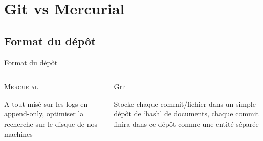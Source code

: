 \section{Git vs Mercurial}
\subsection{Format du dépôt}
\begin{frame}{Format du dépôt}
  \begin{columns}[T]

    \begin{column}{.5\textwidth}
    \textsc{Mercurial}

    \vspace{\baselineskip}

    A tout misé sur les logs en append-only, optimiser la recherche sur le
    disque de nos machines
    \end{column}

    \begin{column}{.5\textwidth}
    \textsc{Git}

    \vspace{\baselineskip}

    Stocke chaque commit/fichier dans un simple dépôt de ‘hash’ de documents,
    chaque commit finira dans ce dépôt comme une entité séparée
    \end{column}

  \end{columns}
\end{frame}

